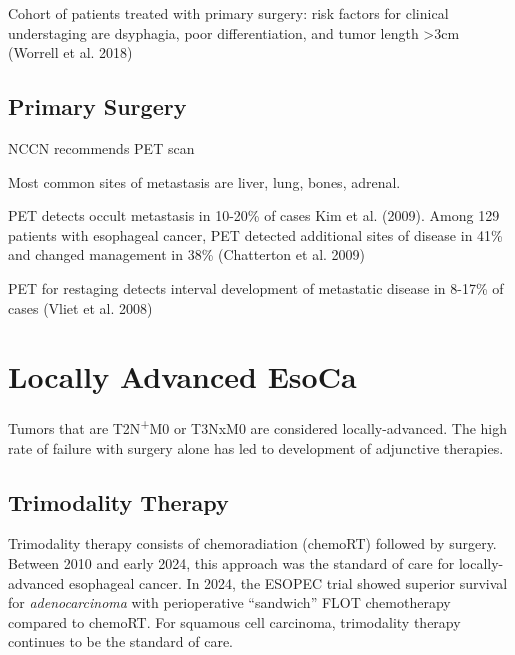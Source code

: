 \documentclass[
  letterpaper,
]{scrbook}
\begin{document}
Cohort of patients treated with primary surgery: risk factors for
clinical understaging are dsyphagia, poor differentiation, and tumor
length \textgreater3cm (Worrell et al. 2018)

\section{Primary Surgery}\label{primary_surgery}

NCCN recommends PET scan

Most common sites of metastasis are liver, lung, bones, adrenal.

PET detects occult metastasis in 10-20\% of cases Kim et al. (2009).
Among 129 patients with esophageal cancer, PET detected additional sites
of disease in 41\% and changed management in 38\% (Chatterton et al.
2009)

PET for restaging detects interval development of metastatic disease in
8-17\% of cases (Vliet et al. 2008)

\chapter{Locally Advanced EsoCa}\label{locally_advanced}

Tumors that are T2N\textsuperscript{+}M0 or T3NxM0 are considered
locally-advanced. The high rate of failure with surgery alone has led to
development of adjunctive therapies.

\section{Trimodality Therapy}\label{trimodality}

Trimodality therapy consists of chemoradiation (chemoRT) followed by
surgery. Between 2010 and early 2024, this approach was the standard of
care for locally-advanced esophageal cancer. In 2024, the ESOPEC trial
showed superior survival for \emph{adenocarcinoma} with perioperative
``sandwich'' FLOT chemotherapy compared to chemoRT. For squamous cell
carcinoma, trimodality therapy continues to be the standard of care.
\end{document}
